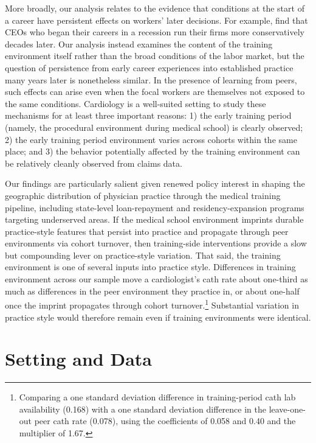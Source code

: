 \documentclass[12pt]{article}
\begin{document}
More broadly, our analysis relates to the evidence that conditions at the start of a career have persistent effects on workers' later decisions. For example, \citet{schoar2017} find that CEOs who began their careers in a recession run their firms more conservatively decades later. Our analysis instead examines the content of the training environment itself rather than the broad conditions of the labor market, but the question of persistence from early career experiences into established practice many years later is nonetheless similar. In the presence of learning from peers, such effects can arise even when the focal workers are themselves not exposed to the same conditions. Cardiology is a well-suited setting to study these mechanisms for at least three important reasons: 1) the early training period (namely, the procedural environment during medical school) is clearly observed; 2) the early training period environment varies across cohorts within the same place; and 3) the behavior potentially affected by the training environment can be relatively cleanly observed from claims data.

Our findings are particularly salient given renewed policy interest in shaping the geographic distribution of physician practice through the medical training pipeline, including state-level loan-repayment and residency-expansion programs targeting underserved areas. If the medical school environment imprints durable practice-style features that persist into practice and propagate through peer environments via cohort turnover, then training-side interventions provide a slow but compounding lever on practice-style variation. That said, the training environment is one of several inputs into practice style. Differences in training environment across our sample move a cardiologist's cath rate about one-third as much as differences in the peer environment they practice in, or about one-half once the imprint propagates through cohort turnover.\footnote{Comparing a one standard deviation difference in training-period cath lab availability (0.168) with a one standard deviation difference in the leave-one-out peer cath rate (0.078), using the coefficients of 0.058 and 0.40 and the multiplier of 1.67.} Substantial variation in practice style would therefore remain even if training environments were identical.

\section{Setting and Data}\label{sec:data}
\end{document}
